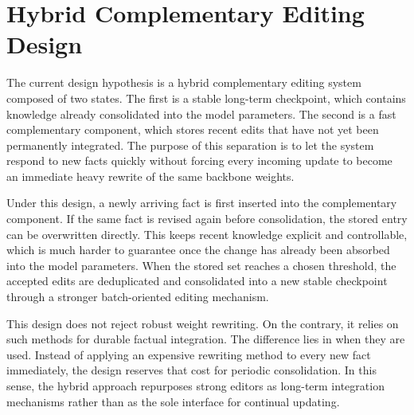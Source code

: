 \section{Hybrid Complementary Editing Design}

The current design hypothesis is a hybrid complementary editing system composed of two states. The first is a stable long-term checkpoint, which contains knowledge already consolidated into the model parameters. The second is a fast complementary component, which stores recent edits that have not yet been permanently integrated. The purpose of this separation is to let the system respond to new facts quickly without forcing every incoming update to become an immediate heavy rewrite of the same backbone weights.

Under this design, a newly arriving fact is first inserted into the complementary component. If the same fact is revised again before consolidation, the stored entry can be overwritten directly. This keeps recent knowledge explicit and controllable, which is much harder to guarantee once the change has already been absorbed into the model parameters. When the stored set reaches a chosen threshold, the accepted edits are deduplicated and consolidated into a new stable checkpoint through a stronger batch-oriented editing mechanism.

This design does not reject robust weight rewriting. On the contrary, it relies on such methods for durable factual integration. The difference lies in when they are used. Instead of applying an expensive rewriting method to every new fact immediately, the design reserves that cost for periodic consolidation. In this sense, the hybrid approach repurposes strong editors as long-term integration mechanisms rather than as the sole interface for continual updating.
